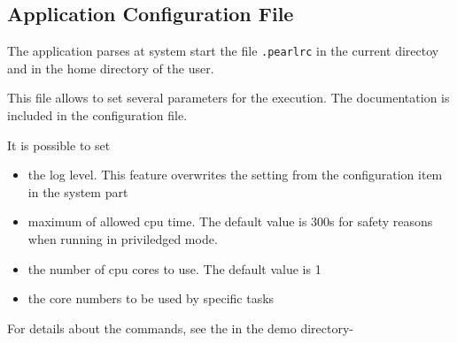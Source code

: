 \subsection{Application Configuration File}

The application parses at system start the file \texttt{.pearlrc} in
the current directoy and in the home directory of the user.

This file allows to set several parameters for the execution.
The documentation is included in the configuration file.

It is possible to set
\begin{itemize}
\item the log level. This feature overwrites the setting 
   from the configuration item in the system part
\item maximum of allowed cpu time. The default value is 300s for safety reasons 
   when running in priviledged mode.
\item the number of cpu cores to use. The default value is 1
\item the core numbers to be used by specific tasks
\end{itemize}

For details about the commands, see the  in the demo directory-


